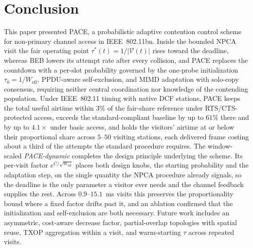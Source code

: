 \documentclass[journal,10pt]{IEEEtran}
\begin{document}
\section{Conclusion}
\label{sec:conclusion}

This paper presented PACE, a probabilistic adaptive contention control
scheme for non-primary channel access in IEEE~802.11bn. Inside the
bounded NPCA visit the fair operating point
$\tau^*(t)=1/|\mathcal{V}(t)|$ rises toward the deadline, whereas BEB
lowers its attempt rate after every collision, and PACE replaces the
countdown with a per-slot probability governed by the one-probe
initialization $\tau_0=1/W_\mathrm{eff}$, PPDU-aware self-exclusion,
and MIMD adaptation with solo-copy consensus, requiring neither
central coordination nor knowledge of the contending population.
Under IEEE~802.11 timing with native DCF stations, PACE keeps the
total useful airtime within $3\%$ of the fair-share
reference under RTS/CTS-protected access, exceeds the
standard-compliant baseline by up to $61\%$ there and by up to
$4.1\times$ under basic access, and holds the visitors' airtime at or
below their proportional share across $5$--$50$ visiting stations,
each delivered frame costing about a third of the attempts the
standard procedure requires. The window-scaled \emph{PACE-dynamic}
completes the design principle underlying the scheme. Its per-visit
factor $e^{C/\sqrt{W_\mathrm{eff}}}$ places both design knobs, the
starting probability and the adaptation step, on the single quantity
the NPCA procedure already signals, so the deadline is the only
parameter a visitor ever needs and the channel feedback supplies the
rest. Across $0.9$--$15.1$~ms visits this preserves the
proportionality bound where a fixed factor drifts past it, and an
ablation confirmed that the initialization and self-exclusion are
both necessary. Future work
includes an asymmetric, cost-aware decrease factor, partial-overlap
topologies with spatial reuse, TXOP aggregation within a visit, and
warm-starting $\tau$ across repeated visits.



\end{document}
